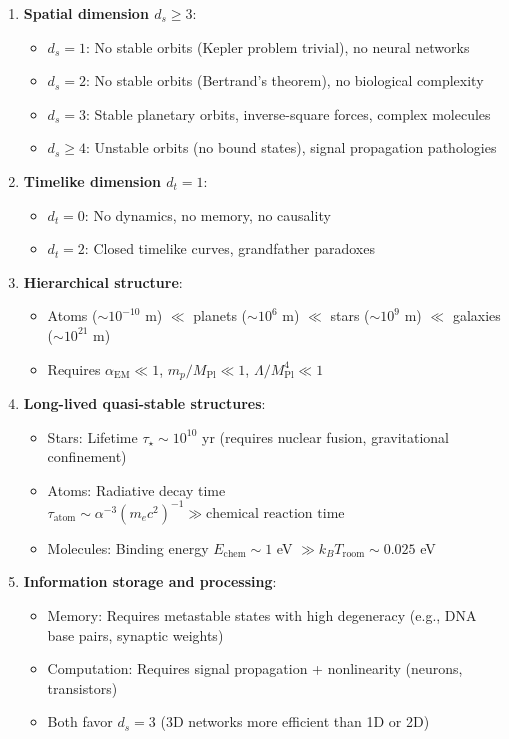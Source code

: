 \documentclass[11pt,a4paper]{article}
\numberwithin{equation}{section}
\theoremstyle{plain}
\theoremstyle{definition}
\theoremstyle{remark}
\begin{document}
\begin{enumerate}
\item \textbf{Spatial dimension $d_s \geq 3$}:
\begin{itemize}
\item $d_s = 1$: No stable orbits (Kepler problem trivial), no neural networks
\item $d_s = 2$: No stable orbits (Bertrand's theorem), no biological complexity
\item $d_s = 3$: Stable planetary orbits, inverse-square forces, complex molecules
\item $d_s \geq 4$: Unstable orbits (no bound states), signal propagation pathologies
\end{itemize}

\item \textbf{Timelike dimension $d_t = 1$}:
\begin{itemize}
\item $d_t = 0$: No dynamics, no memory, no causality
\item $d_t = 2$: Closed timelike curves, grandfather paradoxes
\end{itemize}

\item \textbf{Hierarchical structure}:
\begin{itemize}
\item Atoms ($\sim 10^{-10}$ m) $\ll$ planets ($\sim 10^6$ m) $\ll$ stars ($\sim 10^9$ m) $\ll$ galaxies ($\sim 10^{21}$ m)
\item Requires $\alpha_{\text{EM}} \ll 1$, $m_p/M_{\text{Pl}} \ll 1$, $\Lambda/M_{\text{Pl}}^4 \ll 1$
\end{itemize}

\item \textbf{Long-lived quasi-stable structures}:
\begin{itemize}
\item Stars: Lifetime $\tau_\star \sim 10^{10}$ yr (requires nuclear fusion, gravitational confinement)
\item Atoms: Radiative decay time $\tau_{\text{atom}} \sim \alpha^{-3} (m_e c^2)^{-1} \gg \text{chemical reaction time}$
\item Molecules: Binding energy $E_{\text{chem}} \sim 1$ eV $\gg k_B T_{\text{room}} \sim 0.025$ eV
\end{itemize}

\item \textbf{Information storage and processing}:
\begin{itemize}
\item Memory: Requires metastable states with high degeneracy (e.g., DNA base pairs, synaptic weights)
\item Computation: Requires signal propagation + nonlinearity (neurons, transistors)
\item Both favor $d_s = 3$ (3D networks more efficient than 1D or 2D)
\end{itemize}
\end{enumerate}
\end{document}
